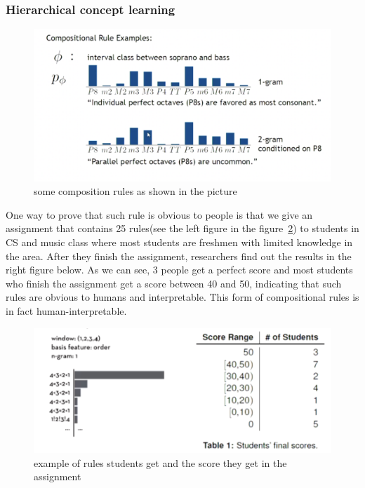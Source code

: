 \documentclass[]{article}
\begin{document}
\subsubsection{Hierarchical concept learning}
\begin{figure}[!ht]
\centering
\includegraphics[width=\textwidth]{FIGS/rule2.png}
\caption{some composition rules as shown in the picture}
\label{fig:ai2}
\end{figure}

One way to prove that such rule is obvious to people is that we give an assignment that contains 25 rules(see the left figure in the figure~\ref{fig:ai3}) to students in CS and music class where most students are freshmen with limited knowledge in the area. After they finish the assignment, researchers find out the results in the right figure below. As we can see, 3 people get a perfect score and most students who finish the assignment get a score between 40 and 50, indicating that such rules are obvious to humans and interpretable. 
This form of compositional rules is in fact human-interpretable.

\begin{figure}[!ht]
\centering
\includegraphics[width=\textwidth]{FIGS/rule3.png}
\caption{example of rules students get and the score they get in the assignment}
\label{fig:ai3}
\end{figure}
\end{document}

